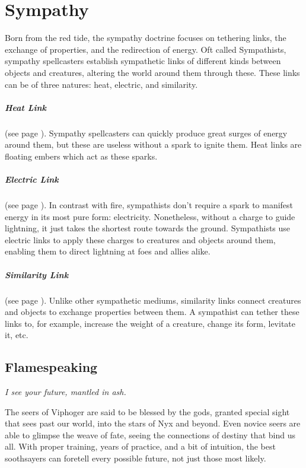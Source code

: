 \section{Sympathy} \label{sec::sympathy}

Born from the red tide, the sympathy doctrine focuses on tethering links, the exchange of properties, and the redirection of energy.
Oft called Sympathists, sympathy spellcasters establish sympathetic links of different kinds between objects and creatures, altering the world around them through these.
These links can be of three natures: heat, electric, and similarity.

\subparagraph{Heat Link}
    (see page \pageref{medium::ember}).
    Sympathy spellcasters can quickly produce great surges of energy around them, but these are useless without a spark to ignite them.
    Heat links are floating embers which act as these sparks.

\subparagraph{Electric Link}
    (see page \pageref{medium::charge}).
    In contrast with fire, sympathists don't require a spark to manifest energy in its most pure form: electricity.
    Nonetheless, without a charge to guide lightning, it just takes the shortest route towards the ground.
    Sympathists use electric links to apply these charges to creatures and objects around them, enabling them to direct lightning at foes and allies alike.

\subparagraph{Similarity Link}
    (see page \pageref{medium::tether}).
    Unlike other sympathetic mediums, similarity links connect creatures and objects to exchange properties between them.
    A sympathist can tether these links to, for example, increase the weight of a creature, change its form, levitate it, etc.

\subsection*{Flamespeaking} \label{ssec::flamespeaking}
    \textit{I see your future, mantled in ash.}

    The seers of Viphoger are said to be blessed by the gods, granted special sight that sees past our world, into the stars of Nyx and beyond.
    Even novice seers are able to glimpse the weave of fate, seeing the connections of destiny that bind us all.
    With proper training, years of practice, and a bit of intuition, the best soothsayers can foretell every possible future, not just those most likely.

